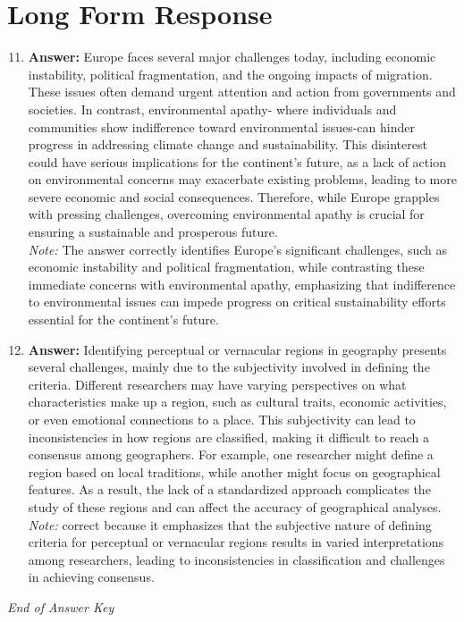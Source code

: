\documentclass[12pt]{article}
\begin{document}
\section*{Long Form Response}
\begin{enumerate}[label=\arabic*.]
\setcounter{enumi}{10}
\item \textbf{Answer:} Europe faces several major challenges today, including economic instability, political fragmentation, and the ongoing impacts of migration. These issues often demand urgent attention and action from governments and societies. In contrast, environmental apathy- where individuals and communities show indifference toward environmental issues-can hinder progress in addressing climate change and sustainability. This disinterest could have serious implications for the continent's future, as a lack of action on environmental concerns may exacerbate existing problems, leading to more severe economic and social consequences. Therefore, while Europe grapples with pressing challenges, overcoming environmental apathy is crucial for ensuring a sustainable and prosperous future.
\\ \textit{Note:} The answer correctly identifies Europe's significant challenges, such as economic instability and political fragmentation, while contrasting these immediate concerns with environmental apathy, emphasizing that indifference to environmental issues can impede progress on critical sustainability efforts essential for the continent's future.
\item \textbf{Answer:} Identifying perceptual or vernacular regions in geography presents several challenges, mainly due to the subjectivity involved in defining the criteria. Different researchers may have varying perspectives on what characteristics make up a region, such as cultural traits, economic activities, or even emotional connections to a place. This subjectivity can lead to inconsistencies in how regions are classified, making it difficult to reach a consensus among geographers. For example, one researcher might define a region based on local traditions, while another might focus on geographical features. As a result, the lack of a standardized approach complicates the study of these regions and can affect the accuracy of geographical analyses.
\\ \textit{Note:} correct because it emphasizes that the subjective nature of defining criteria for perceptual or vernacular regions results in varied interpretations among researchers, leading to inconsistencies in classification and challenges in achieving consensus.
\end{enumerate}

\vfill
\noindent\textit{End of Answer Key}
\end{document}
